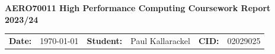 \begin{center}
    \vspace{.5cm}
    \Large{{\bf AERO70011 High Performance Computing Coursework Report 2023/24}} \\
    \vspace{-0.5cm}
\end{center}
\vspace{0.4cm}
\begin{center}
    \begin{tabular}{rlrlrl}
        {\bf    Date:} & {\today} & {\bf Student:} & {Paul Kallarackel} & {\bf CID:} & {02029025}
    \end{tabular}
\end{center}
